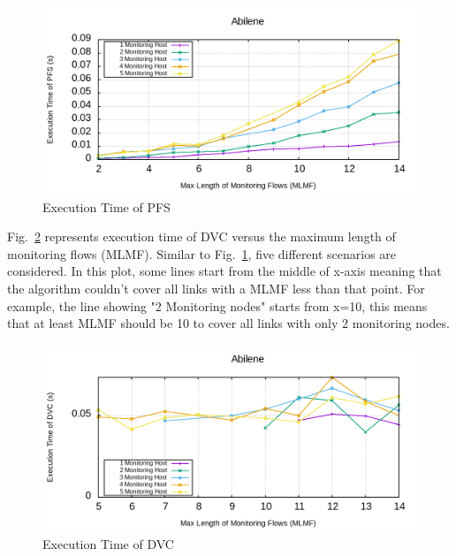 \documentclass[10pt, journal, letterpaper]{IEEEtran}
\begin{document}
\begin{figure}
    \centering
    \includegraphics[width=0.8\columnwidth]{img/eval_Abilene_Max_Length_of_Routes_Execution_time_ILP.png}
    \caption{Execution Time of PFS}
    \label{fig:Abilene_time_PFS}
\end{figure}

Fig.~\ref{fig:Abilene_time_DMI} represents execution time of DVC versus the maximum length of monitoring flows (MLMF). Similar to Fig.~\ref{fig:Abilene_time_PFS}, five different scenarios are considered. In this plot, some lines start from the middle of x-axis meaning that the algorithm couldn't cover all links with a MLMF less than that point. For example, the line showing "2 Monitoring nodes" starts from x=10, this means that at least MLMF should be 10 to cover all links with only 2 monitoring nodes.

\begin{figure}
    \centering
    \includegraphics[width=0.8\columnwidth]{img/eval_Abilene_Max_Length_of_Routes_Execution_time_PSO.png}
    \caption{Execution Time of DVC}
    \label{fig:Abilene_time_DMI}
\end{figure}
\end{document}
